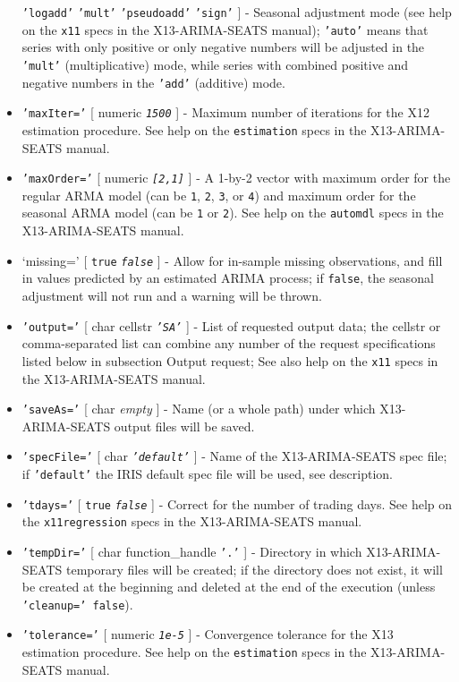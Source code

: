 \begin{itemize}
   \textbar{} \texttt{'logadd'} \textbar{} \texttt{'mult'} \textbar{}
   \texttt{'pseudoadd'} \textbar{} \texttt{'sign'} {]} - Seasonal
   adjustment mode (see help on the \texttt{x11} specs in the
   X13-ARIMA-SEATS manual); \texttt{'auto'} means that series with only
   positive or only negative numbers will be adjusted in the
   \texttt{'mult'} (multiplicative) mode, while series with combined
   positive and negative numbers in the \texttt{'add'} (additive) mode.
 \item
   \texttt{'maxIter='} {[} numeric \textbar{} \emph{\texttt{1500}} {]} -
   Maximum number of iterations for the X12 estimation procedure. See
   help on the \texttt{estimation} specs in the X13-ARIMA-SEATS manual.
 \item
   \texttt{'maxOrder='} {[} numeric \textbar{} \emph{\texttt{{[}2,1{]}}}
   {]} - A 1-by-2 vector with maximum order for the regular ARMA model
   (can be \texttt{1}, \texttt{2}, \texttt{3}, or \texttt{4}) and maximum
   order for the seasonal ARMA model (can be \texttt{1} or \texttt{2}).
   See help on the \texttt{automdl} specs in the X13-ARIMA-SEATS manual.
 \item
   `missing=' {[} \texttt{true} \textbar{} \emph{\texttt{false}} {]} -
   Allow for in-sample missing observations, and fill in values predicted
   by an estimated ARIMA process; if \texttt{false}, the seasonal
   adjustment will not run and a warning will be thrown.
 \item
   \texttt{'output='} {[} char \textbar{} cellstr \textbar{}
   \emph{\texttt{'SA'}} {]} - List of requested output data; the cellstr
   or comma-separated list can combine any number of the request
   specifications listed below in subsection Output request; See also
   help on the \texttt{x11} specs in the X13-ARIMA-SEATS manual.
 \item
   \texttt{'saveAs='} {[} char \textbar{} \emph{empty} {]} - Name (or a
   whole path) under which X13-ARIMA-SEATS output files will be saved.
 \item
   \texttt{'specFile='} {[} char \textbar{} \emph{\texttt{'default'}} {]}
   - Name of the X13-ARIMA-SEATS spec file; if \texttt{'default'} the
   IRIS default spec file will be used, see description.
 \item
   \texttt{'tdays='} {[} \texttt{true} \textbar{} \emph{\texttt{false}}
   {]} - Correct for the number of trading days. See help on the
   \texttt{x11regression} specs in the X13-ARIMA-SEATS manual.
 \item
   \texttt{'tempDir='} {[} char \textbar{} function\_handle \textbar{}
   \texttt{'.'} {]} - Directory in which X13-ARIMA-SEATS temporary files
   will be created; if the directory does not exist, it will be created
   at the beginning and deleted at the end of the execution (unless
   \texttt{'cleanup=' false}).
 \item
   \texttt{'tolerance='} {[} numeric \textbar{} \emph{\texttt{1e-5}} {]}
   - Convergence tolerance for the X13 estimation procedure. See help on
   the \texttt{estimation} specs in the X13-ARIMA-SEATS manual.
 \end{itemize}
 
